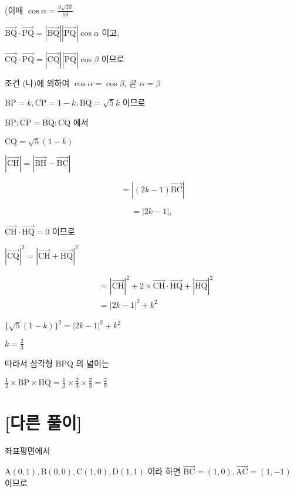 \documentclass[10pt]{article}
\begin{document}
(이때 \(\cos \alpha=\frac{3 \sqrt{10}}{10}\)

\(\overrightarrow{\mathrm{BQ}} \cdot \overrightarrow{\mathrm{PQ}}=|\overrightarrow{\mathrm{BQ}}||\overrightarrow{\mathrm{PQ}}| \cos \alpha\) 이고,

\(\overrightarrow{\mathrm{CQ}} \cdot \overrightarrow{\mathrm{PQ}}=|\overrightarrow{\mathrm{CQ}}||\overrightarrow{\mathrm{PQ}}| \cos \beta\) 이므로

조건 (나)에 의하여 \(\cos \alpha=\cos \beta\), 곧 \(\alpha=\beta\)

\(\overline{\mathrm{BP}}=k, \overline{\mathrm{CP}}=1-k, \overline{\mathrm{BQ}}=\sqrt{5} k\) 이므로

\(\overline{\mathrm{BP}}: \overline{\mathrm{CP}}=\overline{\mathrm{BQ}}: \overline{\mathrm{CQ}}\) 에서

\(\overline{\mathrm{CQ}}=\sqrt{5}(1-k)\)

\(|\overrightarrow{\mathrm{CH}}|=|\overrightarrow{\mathrm{BH}}-\overrightarrow{\mathrm{BC}}|\)

\[
=|(2 k-1) \overrightarrow{\mathrm{BC}}|
\]

\[
=|2 k-1| \text {, }
\]

\(\overrightarrow{\mathrm{CH}} \cdot \overrightarrow{\mathrm{HQ}}=0\) 이므로

\(|\overrightarrow{\mathrm{CQ}}|^{2}=|\overrightarrow{\mathrm{CH}}+\overrightarrow{\mathrm{HQ}}|^{2}\)

\[
\begin{aligned}
& =|\overrightarrow{\mathrm{CH}}|^{2}+2 \times \overrightarrow{\mathrm{CH}} \cdot \overrightarrow{\mathrm{HQ}}+|\overrightarrow{\mathrm{HQ}}|^{2} \\
& =|2 k-1|^{2}+k^{2}
\end{aligned}
\]

\(\{\sqrt{5}(1-k)\}^{2}=|2 k-1|^{2}+k^{2}\)

\(k=\frac{2}{3}\)

따라서 삼각형 BPQ 의 넓이는

\(\frac{1}{2} \times \overline{\mathrm{BP}} \times \overline{\mathrm{HQ}}=\frac{1}{2} \times \frac{2}{3} \times \frac{2}{3}=\frac{2}{9}\)

\section*{[다른 풀이]}
좌표평면에서

\(\mathrm{A}(0,1), \mathrm{B}(0,0), \mathrm{C}(1,0), \mathrm{D}(1,1)\) 이라 하면 \(\overrightarrow{\mathrm{BC}}=(1,0), \overrightarrow{\mathrm{AC}}=(1,-1)\) 이므로
\end{document}
